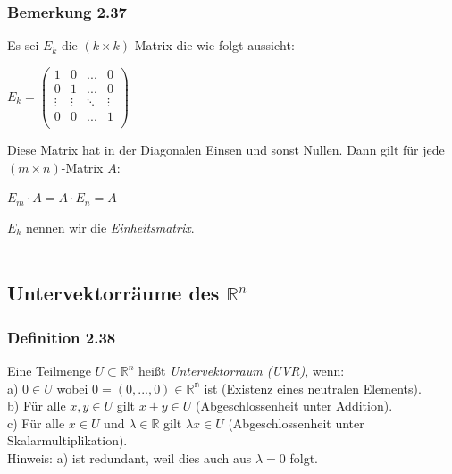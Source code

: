 \documentclass{article}
\begin{document}
\subsubsection*{Bemerkung 2.37}
Es sei $E_k$ die $(k \times k)$-Matrix die wie folgt aussieht: \\
\begin{center}
    $E_k = \begin{pmatrix}
        1 & 0 & ... & 0 \\
        0 & 1 & ... & 0 \\
        \vdots & \vdots & \ddots & \vdots \\
        0 & 0 & ... & 1 \\
    \end{pmatrix}$
\end{center}
Diese Matrix hat in der Diagonalen Einsen und sonst Nullen. Dann gilt für jede $(m \times n)$-Matrix $A$: \\
\begin{center}
    $E_m \cdot A = A \cdot E_n = A$
\end{center}
$E_k$ nennen wir die \textit{Einheitsmatrix}. \\
\\
\subsection{Untervektorräume des $\mathbb{R}^n$}
\subsubsection*{Definition 2.38}
Eine Teilmenge $U \subset \mathbb{R}^n$ heißt \textit{Untervektorraum (UVR)}, wenn: \\
a) $0 \in U$ wobei $0=(0, ..., 0) \in \mathbb{R^n}$ ist (Existenz eines neutralen Elements). \\
b) Für alle $x,y \in U$ gilt $x+y \in U$ (Abgeschlossenheit unter Addition). \\
c) Für alle $x \in U$ und $\lambda \in \mathbb{R}$ gilt $\lambda x \in U$ (Abgeschlossenheit unter Skalarmultiplikation). \\
Hinweis: a) ist redundant, weil dies auch aus $\lambda = 0$ folgt.\\
\\
\end{document}
